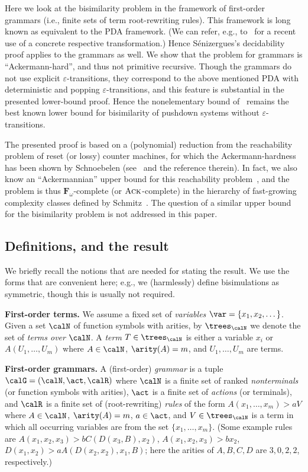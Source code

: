\documentclass[a4paper,11pt]{article}
\begin{document}
Here we look at the bisimilarity problem in the framework of 
first-order grammars (i.e., finite sets of term root-rewriting rules). 
This framework is long known as equivalent to the PDA framework.
(We can refer, e.g., to~\cite{JancarLICS12} for a recent use of a concrete
respective transformation.)
Hence  S\'enizergues's decidability proof applies to the grammars as
well.
We show that the problem for grammars is
``Ackermann-hard'', and thus not primitive recursive. 
Though the grammars do not use explicit $\varepsilon$-transitions, they
correspond to the above mentioned PDA with deterministic and popping
$\varepsilon$-transitions, and this feature is substantial in the
presented lower-bound proof.
Hence the nonelementary bound of~\cite{BGKM12} remains
the best known lower bound for bisimilarity of pushdown systems
without $\varepsilon$-transitions.

The presented proof is based on
a (polynomial) reduction from the reachability problem of reset (or
lossy) counter machines, for which  the Ackermann-hardness has been
shown by Schnoebelen (see~\cite{DBLP:conf/mfcs/Schnoebelen10} and the
reference therein).
In fact, we also know an ``Ackermannian'' upper bound for this
reachability problem~\cite{DBLP:conf/lics/FigueiraFSS11}, 
and the problem is thus $\mathbf{F}_\omega$-complete (or 
$\textsc{Ack}$-complete) 
 in the hierarchy of fast-growing
complexity classes defined by Schmitz~\cite{Schmitz2013}.
The question of a similar
upper bound for the bisimilarity problem is not addressed in this
paper.


\subsection*{Definitions, and the result}

We briefly recall the notions 
that are needed for stating the result. We use the forms that are
convenient here; e.g., we (harmlessly) 
define bisimulations as symmetric, though
this is usually not required. 

\textbf{First-order terms.}
We assume a fixed set of 
\emph{variables} $\var=\{x_1,x_2,\dots\}$.
Given a set $\calN$ of function symbols with arities,
by $\trees_\calN$ we
denote the set of \emph{terms over} $\calN$.
A \emph{term} $T\in\trees_\calN$
is either  a variable $x_i$ 
or  $A(U_1,\dots,U_m)$ where 
$A\in\calN$, 
$\arity(A)=m$, and $U_1,\dots,U_m$ are terms.

\textbf{First-order grammars.}
A (first-order) \emph{grammar} is a tuple $\calG=(\calN,\act,\calR)$
where $\calN$ is a finite set of ranked \emph{nonterminals}
(or function symbols with arities),
$\act$ is a finite set of  \emph{actions} (or terminals),
and $\calR$ is a finite set of (root-rewriting) \emph{rules} of the form
$A(x_1,\dots,x_m)\gt{a}V$ where 
$A\in\calN$, $\arity(A)=m$,
$a\in\act$, and
$V\in\trees_{\calN}$ is a 
term
in which all occurring variables are from the set 
$\{x_1,\dots,x_m\}$.
(Some example rules are $A(x_1,x_2,x_3)\gt{b}C(D(x_3,B),x_2)$,
$A(x_1,x_2,x_3)\gt{b}x_2$,
$D(x_1,x_2)\gt{a}A(D(x_2,x_2),x_1,B)$; here
 the arities of $A,B,C,D$ are $3,0,2,2$, respectively.)
\end{document}
